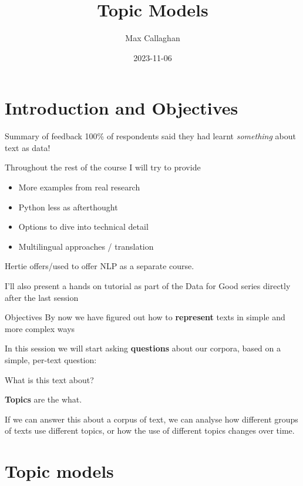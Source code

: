 \documentclass[
  10pt,
  ignorenonframetext,
  aspectratio=169]{beamer}
\title{Topic Models}
\author{Max Callaghan}
\date{2023-11-06}
\providecommand{\tightlist}{%
  \setlength{\itemsep}{0pt}\setlength{\parskip}{0pt}}
\begin{document}
\frame{\titlepage}

\hypertarget{introduction-and-objectives}{%
\section{Introduction and
Objectives}\label{introduction-and-objectives}}

\begin{frame}{Summary of feedback}
\protect\hypertarget{summary-of-feedback}{}
100\% of respondents said they had learnt \emph{something} about text as
data!

Throughout the rest of the course I will try to provide

\begin{itemize}
\tightlist
\item
  More examples from real research
\item
  Python less as afterthought
\item
  Options to dive into technical detail
\item
  Multilingual approaches / translation
\end{itemize}

Hertie offers/used to offer NLP as a separate course.

I'll also present a hands on tutorial as part of the Data for Good
series directly after the last session
\end{frame}

\begin{frame}{Objectives}
\protect\hypertarget{objectives}{}
By now we have figured out how to \textbf{represent} texts in simple and
more complex ways

In this session we will start asking \textbf{questions} about our
corpora, based on a simple, per-text question:

What is this text about?

\textbf{Topics} are the what.

If we can answer this about a corpus of text, we can analyse how
different groups of texts use different topics, or how the use of
different topics changes over time.
\end{frame}

\hypertarget{topic-models}{%
\section{Topic models}\label{topic-models}}
\end{document}
